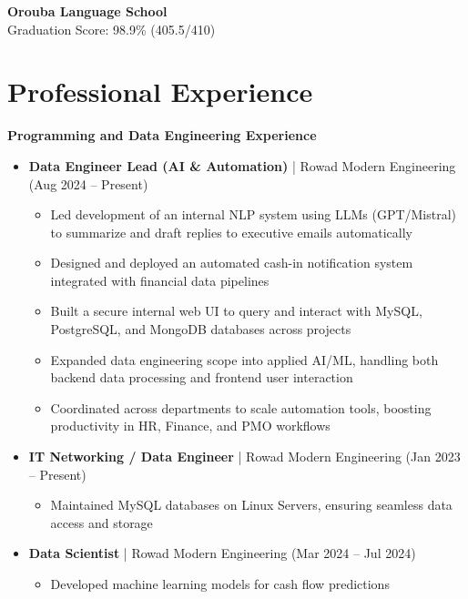 \documentclass[10pt, letterpaper]{article}
\begin{document}
\begin{mdframed}[style=cvframe]
\begin{multicols}{2}
\textbf{Orouba Language School} \\
Graduation Score: 98.9\% (405.5/410)

\section{Professional Experience}
\textbf{\textcolor{primaryColor}{Programming and Data Engineering Experience}}
\begin{itemize}[leftmargin=*]
    \item \textbf{Data Engineer Lead (AI \& Automation)} | Rowad Modern Engineering (Aug 2024 -- Present)
    \begin{itemize}[leftmargin=1cm]
        \item Led development of an internal NLP system using LLMs (GPT/Mistral) to summarize and draft replies to executive emails automatically
        \item Designed and deployed an automated cash-in notification system integrated with financial data pipelines
        \item Built a secure internal web UI to query and interact with MySQL, PostgreSQL, and MongoDB databases across projects
        \item Expanded data engineering scope into applied AI/ML, handling both backend data processing and frontend user interaction
        \item Coordinated across departments to scale automation tools, boosting productivity in HR, Finance, and PMO workflows
    \end{itemize}

\columnbreak

    \item \textbf{IT Networking / Data Engineer} | Rowad Modern Engineering (Jan 2023 -- Present)
    \begin{itemize}[leftmargin=1cm]
        \item Maintained MySQL databases on Linux Servers, ensuring seamless data access and storage
    \end{itemize}

    \item \textbf{Data Scientist} | Rowad Modern Engineering (Mar 2024 -- Jul 2024)
    \begin{itemize}[leftmargin=1cm]
        \item Developed machine learning models for cash flow predictions
    \end{itemize}
    

\end{itemize}
\end{multicols}
\end{mdframed}
\end{document}
